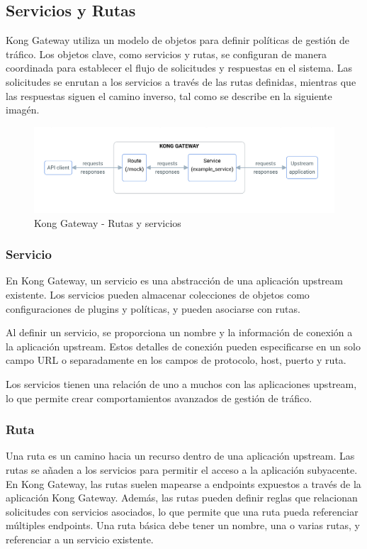 \subsection*{Servicios y Rutas}

Kong Gateway utiliza un modelo de objetos para definir políticas de gestión de tráfico. 
Los objetos clave, como servicios y rutas, se configuran de manera coordinada para establecer 
el flujo de solicitudes y respuestas en el sistema. Las solicitudes se enrutan a los servicios 
a través de las rutas definidas, mientras que las respuestas siguen el camino inverso, tal como se describe en 
la siguiente imagén.

\begin{figure}[h!]
  \centering
  \includegraphics[width=\textwidth]{images/kong-gateway.png}
  \caption{Kong Gateway - Rutas y servicios}
  \label{fig:kong_gateway_rutas_servicios}
\end{figure}

\subsubsection*{Servicio}
En Kong Gateway, un servicio es una abstracción de una aplicación upstream existente. 
Los servicios pueden almacenar colecciones de objetos como configuraciones de plugins y políticas, y pueden asociarse con rutas.

Al definir un servicio, se proporciona un nombre y la información de conexión a 
la aplicación upstream. Estos detalles de conexión pueden especificarse en un solo 
campo URL o separadamente en los campos de protocolo, host, puerto y ruta.

Los servicios tienen una relación de uno a muchos con las aplicaciones upstream, 
lo que permite crear comportamientos avanzados de gestión de tráfico.

\subsubsection*{Ruta}

Una ruta es un camino hacia un recurso dentro de una aplicación upstream. 
Las rutas se añaden a los servicios para permitir el acceso a la aplicación subyacente. 
En Kong Gateway, las rutas suelen mapearse a endpoints expuestos a través de la aplicación Kong Gateway. 
Además, las rutas pueden definir reglas que relacionan solicitudes con servicios asociados, 
lo que permite que una ruta pueda referenciar múltiples endpoints. Una ruta básica debe tener un nombre, 
una o varias rutas, y referenciar a un servicio existente.

